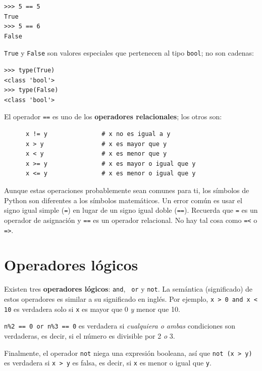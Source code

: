 \documentclass[10pt]{book}
\begin{document}
\begin{verbatim}
>>> 5 == 5
True
>>> 5 == 6
False
\end{verbatim}
%
{\tt True} y {\tt False} son valores
especiales que pertenecen al tipo {\tt bool}; no son cadenas:

\begin{verbatim}
>>> type(True)
<class 'bool'>
>>> type(False)
<class 'bool'>
\end{verbatim}
%
El operador {\tt ==} es uno de los {\bf operadores relacionales}; los
otros son:

\begin{verbatim}
      x != y               # x no es igual a y
      x > y                # x es mayor que y
      x < y                # x es menor que y
      x >= y               # x es mayor o igual que y
      x <= y               # x es menor o igual que y
\end{verbatim}
%
Aunque estas operaciones probablemente sean comunes para ti, los símbolos de Python
son diferentes a los símbolos matemáticos.  Un error común
es usar el signo igual simple ({\tt =}) en lugar de un signo igual doble
({\tt ==}).  Recuerda que {\tt =} es un operador de asignación y
{\tt ==} es un operador relacional.   No hay tal cosa como
{\tt =<} o {\tt =>}.


\section {Operadores lógicos}

Existen tres {\bf operadores lógicos}: {\tt and}, {\tt
or} y {\tt not}.  La semántica (significado) de estos operadores es
similar a su significado en inglés.  Por ejemplo,
{\tt x > 0 and x < 10} es verdadera solo si {\tt x} es mayor que 0
{\em y} menor que 10.

{\tt n\%2 == 0 or n\%3 == 0} es verdadera si {\em cualquiera o ambas}
condiciones son verdaderas, es decir, si el número es divisible por 2 {\em o}
3.

Finalmente, el operador {\tt not} niega una expresión
booleana, así que {\tt not (x > y)} es verdadera si {\tt x > y} es falsa,
es decir, si {\tt x} es menor o igual que {\tt y}.
\end{document}
